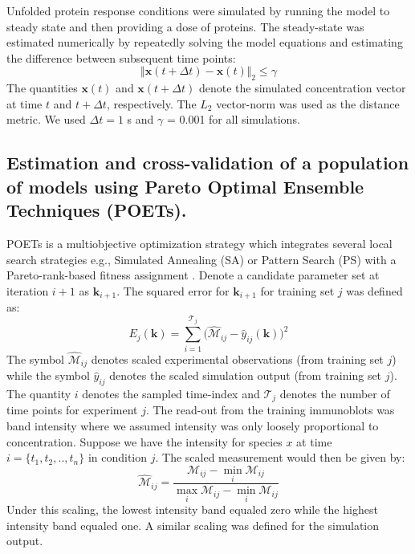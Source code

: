 \documentclass[fleqn,10pt]{wlscirep}
\begin{document}
Unfolded protein response conditions were simulated by running the model to steady state and then providing a dose of proteins. 
The steady-state was estimated numerically by repeatedly solving the model equations and estimating the difference between subsequent time points:
\begin{equation}
\Vert\mathbf{x}\left(t+\Delta{t}\right) - \mathbf{x}\left(t\right)\Vert_{2}\leq\gamma
\end{equation}
The quantities $\mathbf{x}\left(t\right)$ and $\mathbf{x}\left(t+\Delta{t}\right)$ denote the simulated concentration vector at time $t$ and $t + \Delta{t}$, respectively.
The $L_{2}$ vector-norm was used as the distance metric. 
We used $\Delta{t} = 1$ s and $\gamma$ = 0.001 for all simulations.

\subsection*{Estimation and cross-validation of a population of models using Pareto Optimal Ensemble Techniques (POETs).}
POETs is a multiobjective optimization strategy which integrates several local search strategies e.g., Simulated Annealing (SA) or Pattern Search (PS) 
with a Pareto-rank-based fitness assignment \cite{Song:2010ij}.
Denote a candidate parameter set at iteration $i+1$ as $\mathbf{k}_{i+1}$. 
The squared error for $\mathbf{k}_{i+1}$ for training set $j$ was defined as:
\begin{equation}\label{eqn_cost2}
	E_{j}(\mathbf{k}) = \sum_{i=1}^{\mathcal{T}_{j}}\biggl(\hat{\mathcal{M}}_{ij}-\hat{y}_{ij}(\mathbf{k})\biggr)^2
\end{equation}
The symbol $\hat{\mathcal{M}}_{ij}$ denotes scaled experimental observations (from training set $j$) while the symbol $\hat{y}_{ij}$ denotes the scaled simulation output (from training set $j$). 
The quantity $i$ denotes the sampled time-index and $\mathcal{T}_{j}$ denotes the number of time points for experiment $j$. 
The read-out from the training immunoblots was band intensity where we assumed intensity was only loosely proportional to concentration.
Suppose we have the intensity for species $x$ at time $i=\{t_{1},t_{2},..,t_{n}\}$ in condition $j$. The scaled measurement would then be given by:
\begin{equation}\label{norm_exp_data}
\hat{\mathcal{M}}_{ij} = \frac{\mathcal{M}_{ij} - \min_{i}\mathcal{M}_{ij}}{\max_{i}{\mathcal{M}_{ij}}-\min_{i}{\mathcal{M}_{ij}}}
\end{equation}
Under this scaling, the lowest intensity band equaled zero while the highest intensity band equaled one. 
A similar scaling was defined for the simulation output. 
\end{document}
